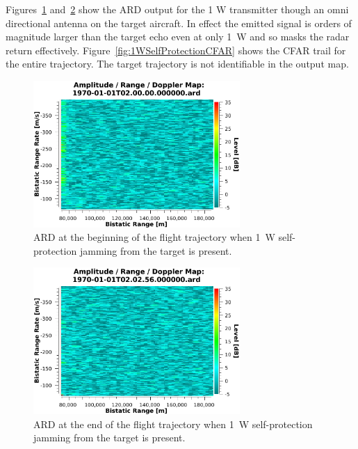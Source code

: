 \documentclass[english, 12pt]{report}
\begin{document}
Figures~\ref{fig:1WSelfProtectionARDFirst} and~\ref{fig:1WSelfProtectionARDLast} show the ARD output for the 1 W transmitter though an omni directional antenna on the target aircraft. In effect the emitted signal is orders of magnitude larger than the target echo even at only 1~W and so masks the radar return effectively. Figure~\ref{fig:1WSelfProtectionCFAR} shows the CFAR trail for the entire trajectory. The target trajectory is not identifiable in the output map.

\begin{figure}[htbp]
\begin{center}
\includegraphics[width=0.7\textwidth]{figs/Simulations/1WSelfProtectionARDFirst.pdf}
\caption{ARD at the beginning of the flight trajectory when 1~W self-protection jamming from the target is present.}
\label{fig:1WSelfProtectionARDFirst}
\end{center}
\end{figure}

\begin{figure}[htbp]
\begin{center}
\includegraphics[width=0.7\textwidth]{figs/Simulations/1WSelfProtectionARDLast.pdf}
\caption[1~W self-protection jamming from the target is present]{ARD at the end of the flight trajectory when 1~W self-protection jamming from the target is present.}
\label{fig:1WSelfProtectionARDLast}
\end{center}
\end{figure}
\end{document}
